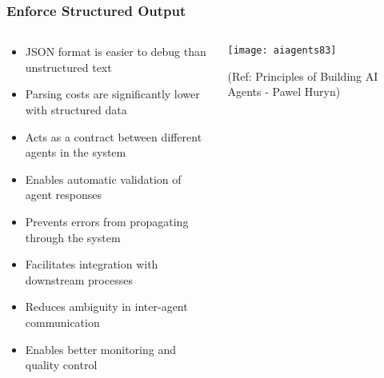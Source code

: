 \begin{frame}[fragile]\frametitle{Enforce Structured Output}
\begin{columns}
    \begin{column}[T]{0.6\linewidth}
      \begin{itemize}
		\item JSON format is easier to debug than unstructured text
		\item Parsing costs are significantly lower with structured data
		\item Acts as a contract between different agents in the system
		\item Enables automatic validation of agent responses
		\item Prevents errors from propagating through the system
		\item Facilitates integration with downstream processes
		\item Reduces ambiguity in inter-agent communication
		\item Enables better monitoring and quality control
	  \end{itemize}
    \end{column}
    \begin{column}[T]{0.4\linewidth}
		\begin{center}
		\texttt{[image: aiagents83]}
		
		{\tiny (Ref: Principles of Building AI Agents - Pawel Huryn)}
		\end{center}	
    \end{column}
  \end{columns}
\end{frame}


